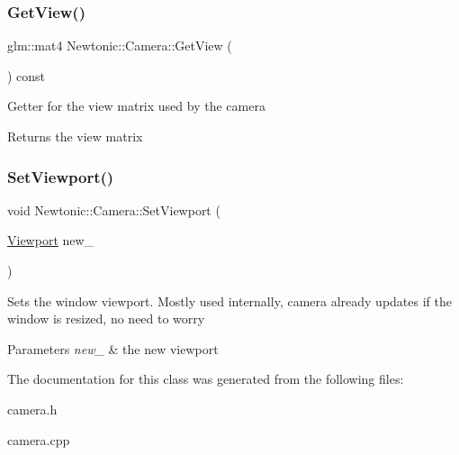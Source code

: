 \subsubsection{\texorpdfstring{GetView()}{GetView()}}
{\footnotesize\ttfamily glm\+::mat4 Newtonic\+::\+Camera\+::\+Get\+View (\begin{DoxyParamCaption}{ }\end{DoxyParamCaption}) const}

Getter for the view matrix used by the camera \begin{DoxyReturn}{Returns}
the view matrix 
\end{DoxyReturn}
\mbox{\label{classNewtonic_1_1Camera_a52323bc782925980f9ba847643afd9f8}} 
\subsubsection{\texorpdfstring{SetViewport()}{SetViewport()}}
{\footnotesize\ttfamily void Newtonic\+::\+Camera\+::\+Set\+Viewport (\begin{DoxyParamCaption}\item[{\mbox{\hyperlink{structNewtonic_1_1Viewport}{Viewport}}}]{new\+\_\+ }\end{DoxyParamCaption})\hspace{0.3cm}{\ttfamily [inline]}}

Sets the window viewport. Mostly used internally, camera already updates if the window is resized, no need to worry 
\begin{DoxyParams}{Parameters}
{\em new\+\_\+} & the new viewport \\
\hline
\end{DoxyParams}


The documentation for this class was generated from the following files\+:\begin{DoxyCompactItemize}
\item 
camera.\+h\item 
camera.\+cpp\end{DoxyCompactItemize}
